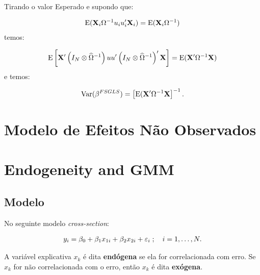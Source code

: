 \documentclass[11pt, oneside, a4paper, article]{article}
\numberwithin{equation}{section}
\begin{document}
Tirando o valor Esperado e supondo que:

\vspace{-1.5 em}
\begin{align*}
\text{E}(\mathbf{X}_{i} \Omega^{-1} u_{i} u_{i}' \mathbf{X}_{i}) = \text{E}(\mathbf{X}_{i} \Omega^{-1})
\end{align*}
temos:

\vspace{-1.5 em}
\begin{align*}
\text{E}\left[ \mathbf{X}' \left( I_{N} \otimes \widehat{\Omega}^{-1} \right)
	u u'
\left( I_{N} \otimes \widehat{\Omega}^{-1} \right)' \mathbf{X} \right]
=
\text{E}(\mathbf{X}' \Omega^{-1} \mathbf{X})
\end{align*}
e temos:

\vspace{-1.5 em}
\begin{align*}
	\text{Var}(\beta^{FSGLS}) = \left[ \text{E}(\mathbf{X}' \Omega^{-1} \mathbf{X} \right]^{-1}.
\end{align*}


\clearpage
\section{Modelo de Efeitos Não Observados}
\citet[C.10 -- Basic Linear Unobserved Effects Panel Data Models]{wool-2010}

\clearpage
\section{Endogeneity and GMM}


\subsection*{Modelo}

No seguinte modelo \textit{cross-section}:

\vspace{-1 em}
\begin{align} \label{mod1}
	y_{i} = \beta_{0} + \beta_{1} x_{1i} + \beta_{2} x_{2i} + \varepsilon_{i}
	\; ; \quad i = 1, \dots, N.
\end{align}

\noindent
A variável explicativa $x_{k}$ é dita \textbf{endógena} se ela for correlacionada com erro.
Se $x_{k}$ for não correlacionada com o erro, então $x_{k}$ é dita \textbf{exógena}.
\end{document}
